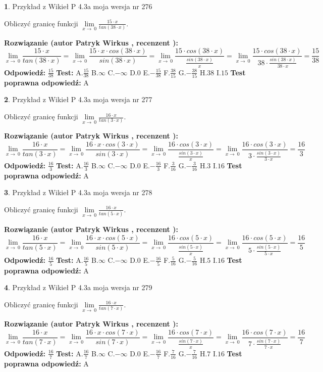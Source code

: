 \documentclass[12pt, a4paper]{article}
\theoremstyle{definition} %
\newtheorem{zad}{}
\newcommand{\zadStart}[1]{\begin{zad}#1\newline}
\newcommand{\zadStop}{\end{zad}}
\newcommand{\rozwStart}[2]{\noindent \textbf{Rozwiązanie (autor #1 , recenzent #2): }\newline}
\newcommand{\rozwStop}{\newline}
\newcommand{\odpStart}{\noindent \textbf{Odpowiedź:}\newline}
\newcommand{\odpStop}{\newline}
\newcommand{\testStart}{\noindent \textbf{Test:}\newline}
\newcommand{\testStop}{\newline}
\newcommand{\kluczStart}{\noindent \textbf{Test poprawna odpowiedź:}\newline}
\newcommand{\kluczStop}{\newline}
\begin{document}
\zadStart{Przykład z Wikieł P 4.3a moja wersja nr 276}


Obliczyć granicę funkcji $\lim\limits_{x\to\ 0}\frac{15 \cdot x}{tan(38 \cdot x)}$.
\zadStop
\rozwStart{Patryk Wirkus}{}
$$\lim\limits_{x\to\ 0}\frac{15 \cdot x}{tan(38 \cdot x)}=\lim\limits_{x\to\ 0}\frac{15 \cdot x \cdot cos(38 \cdot x)}{sin(38 \cdot x)}=\lim\limits_{x\to\ 0}\frac{15 \cdot cos(38 \cdot x)}{\frac{sin(38 \cdot x)}{x}}=\lim\limits_{x\to\ 0}\frac{15 \cdot cos(38 \cdot x)}{38 \cdot \frac{sin(38 \cdot x)}{38 \cdot x}} = \frac{15}{38}$$
\rozwStop
\odpStart
$\frac{15}{38}$
\odpStop
\testStart
A.$\frac{15}{38}$
B.$\infty$
C.$-\infty$
D.$0$
E.$-\frac{15}{38}$
F.$\frac{38}{15}$
G.$-\frac{38}{15}$
H.$38$
I.$15$
\testStop
\kluczStart
A
\kluczStop



\zadStart{Przykład z Wikieł P 4.3a moja wersja nr 277}


Obliczyć granicę funkcji $\lim\limits_{x\to\ 0}\frac{16 \cdot x}{tan(3 \cdot x)}$.
\zadStop
\rozwStart{Patryk Wirkus}{}
$$\lim\limits_{x\to\ 0}\frac{16 \cdot x}{tan(3 \cdot x)}=\lim\limits_{x\to\ 0}\frac{16 \cdot x \cdot cos(3 \cdot x)}{sin(3 \cdot x)}=\lim\limits_{x\to\ 0}\frac{16 \cdot cos(3 \cdot x)}{\frac{sin(3 \cdot x)}{x}}=\lim\limits_{x\to\ 0}\frac{16 \cdot cos(3 \cdot x)}{3 \cdot \frac{sin(3 \cdot x)}{3 \cdot x}} = \frac{16}{3}$$
\rozwStop
\odpStart
$\frac{16}{3}$
\odpStop
\testStart
A.$\frac{16}{3}$
B.$\infty$
C.$-\infty$
D.$0$
E.$-\frac{16}{3}$
F.$\frac{3}{16}$
G.$-\frac{3}{16}$
H.$3$
I.$16$
\testStop
\kluczStart
A
\kluczStop



\zadStart{Przykład z Wikieł P 4.3a moja wersja nr 278}


Obliczyć granicę funkcji $\lim\limits_{x\to\ 0}\frac{16 \cdot x}{tan(5 \cdot x)}$.
\zadStop
\rozwStart{Patryk Wirkus}{}
$$\lim\limits_{x\to\ 0}\frac{16 \cdot x}{tan(5 \cdot x)}=\lim\limits_{x\to\ 0}\frac{16 \cdot x \cdot cos(5 \cdot x)}{sin(5 \cdot x)}=\lim\limits_{x\to\ 0}\frac{16 \cdot cos(5 \cdot x)}{\frac{sin(5 \cdot x)}{x}}=\lim\limits_{x\to\ 0}\frac{16 \cdot cos(5 \cdot x)}{5 \cdot \frac{sin(5 \cdot x)}{5 \cdot x}} = \frac{16}{5}$$
\rozwStop
\odpStart
$\frac{16}{5}$
\odpStop
\testStart
A.$\frac{16}{5}$
B.$\infty$
C.$-\infty$
D.$0$
E.$-\frac{16}{5}$
F.$\frac{5}{16}$
G.$-\frac{5}{16}$
H.$5$
I.$16$
\testStop
\kluczStart
A
\kluczStop



\zadStart{Przykład z Wikieł P 4.3a moja wersja nr 279}


Obliczyć granicę funkcji $\lim\limits_{x\to\ 0}\frac{16 \cdot x}{tan(7 \cdot x)}$.
\zadStop
\rozwStart{Patryk Wirkus}{}
$$\lim\limits_{x\to\ 0}\frac{16 \cdot x}{tan(7 \cdot x)}=\lim\limits_{x\to\ 0}\frac{16 \cdot x \cdot cos(7 \cdot x)}{sin(7 \cdot x)}=\lim\limits_{x\to\ 0}\frac{16 \cdot cos(7 \cdot x)}{\frac{sin(7 \cdot x)}{x}}=\lim\limits_{x\to\ 0}\frac{16 \cdot cos(7 \cdot x)}{7 \cdot \frac{sin(7 \cdot x)}{7 \cdot x}} = \frac{16}{7}$$
\rozwStop
\odpStart
$\frac{16}{7}$
\odpStop
\testStart
A.$\frac{16}{7}$
B.$\infty$
C.$-\infty$
D.$0$
E.$-\frac{16}{7}$
F.$\frac{7}{16}$
G.$-\frac{7}{16}$
H.$7$
I.$16$
\testStop
\kluczStart
A
\kluczStop
\end{document}
